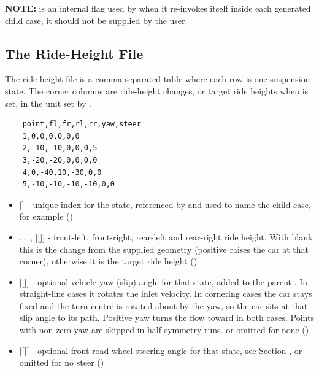 \textbf{NOTE:}  is an internal flag used by  when it re-invokes itself inside each generated child case, it should not be supplied by the user.

\subsection{The Ride-Height File}
The ride-height file is a comma separated table where each row is one suspension state. The corner columns are ride-height changes, or target ride heights when  is set, in the unit set by .
\begin{lstlisting}
    point,fl,fr,rl,rr,yaw,steer
    1,0,0,0,0,0,0
    2,-10,-10,0,0,0,5
    3,-20,-20,0,0,0,0
    4,0,-40,10,-30,0,0
    5,-10,-10,-10,-10,0,0
\end{lstlisting}
\begin{itemize}
    \item {} [] - unique index for the state, referenced by  and used to name the child case, for example  ()

    \item {}, , ,  [[]] - front-left, front-right, rear-left and rear-right ride height. With  blank this is the change from the supplied geometry (positive raises the car at that corner), otherwise it is the target ride height ()

    \item {} [[]] - optional vehicle yaw (slip) angle for that state, added to the parent . In straight-line cases it rotates the inlet velocity. In cornering cases the car stays fixed and the turn centre is rotated about  by the yaw, so the car sits at that slip angle to its path. Positive yaw turns the flow toward  in both cases. Points with non-zero yaw are skipped in half-symmetry runs.  or omitted for none ()

    \item {} [[]] - optional front road-wheel steering angle for that state, see Section ,  or omitted for no steer ()
\end{itemize}

